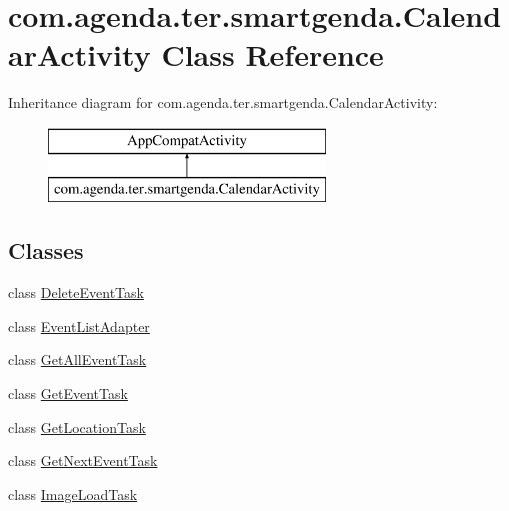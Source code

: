 \hypertarget{classcom_1_1agenda_1_1ter_1_1smartgenda_1_1_calendar_activity}{\section{com.\-agenda.\-ter.\-smartgenda.\-Calendar\-Activity Class Reference}
\label{classcom_1_1agenda_1_1ter_1_1smartgenda_1_1_calendar_activity}
}
Inheritance diagram for com.\-agenda.\-ter.\-smartgenda.\-Calendar\-Activity\-:\begin{figure}[H]
\begin{center}
\leavevmode
\includegraphics[height=2.000000cm]{classcom_1_1agenda_1_1ter_1_1smartgenda_1_1_calendar_activity}
\end{center}
\end{figure}
\subsection*{Classes}
\begin{DoxyCompactItemize}
\item 
class \hyperlink{classcom_1_1agenda_1_1ter_1_1smartgenda_1_1_calendar_activity_1_1_delete_event_task}{Delete\-Event\-Task}
\item 
class \hyperlink{classcom_1_1agenda_1_1ter_1_1smartgenda_1_1_calendar_activity_1_1_event_list_adapter}{Event\-List\-Adapter}
\item 
class \hyperlink{classcom_1_1agenda_1_1ter_1_1smartgenda_1_1_calendar_activity_1_1_get_all_event_task}{Get\-All\-Event\-Task}
\item 
class \hyperlink{classcom_1_1agenda_1_1ter_1_1smartgenda_1_1_calendar_activity_1_1_get_event_task}{Get\-Event\-Task}
\item 
class \hyperlink{classcom_1_1agenda_1_1ter_1_1smartgenda_1_1_calendar_activity_1_1_get_location_task}{Get\-Location\-Task}
\item 
class \hyperlink{classcom_1_1agenda_1_1ter_1_1smartgenda_1_1_calendar_activity_1_1_get_next_event_task}{Get\-Next\-Event\-Task}
\item 
class \hyperlink{classcom_1_1agenda_1_1ter_1_1smartgenda_1_1_calendar_activity_1_1_image_load_task}{Image\-Load\-Task}
\end{DoxyCompactItemize}
